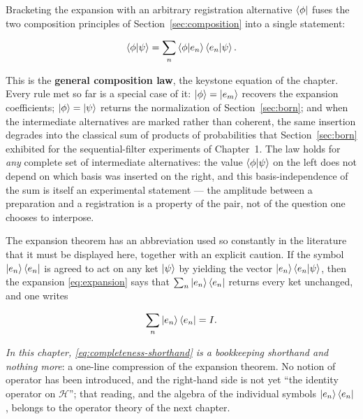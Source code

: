 Bracketing the expansion with an arbitrary registration alternative $\bra{\phi}$ fuses the two composition principles of Section~\ref{sec:composition} into a single statement:
\begin{linenomath}
    \begin{equation}
        \braket{\phi|\psi}=\sum_n\braket{\phi|e_n}\braket{e_n|\psi}.
        \label{eq:composition-law}
    \end{equation}
\end{linenomath}
This is the \textbf{general composition law}, the keystone equation of the chapter. Every rule met so far is a special case of it: $\ket{\phi}=\ket{e_m}$ recovers the expansion coefficients; $\ket{\phi}=\ket{\psi}$ returns the normalization of Section~\ref{sec:born}; and when the intermediate alternatives are marked rather than coherent, the same insertion degrades into the classical sum of products of probabilities that Section~\ref{sec:born} exhibited for the sequential-filter experiments of Chapter~1. The law holds for \emph{any} complete set of intermediate alternatives: the value $\braket{\phi|\psi}$ on the left does not depend on which basis was inserted on the right, and this basis-independence of the sum is itself an experimental statement --- the amplitude between a preparation and a registration is a property of the pair, not of the question one chooses to interpose.

The expansion theorem has an abbreviation used so constantly in the literature that it must be displayed here, together with an explicit caution. If the symbol $\ket{e_n}\bra{e_n}$ is agreed to act on any ket $\ket{\psi}$ by yielding the vector $\ket{e_n}\braket{e_n|\psi}$, then the expansion \eqref{eq:expansion} says that $\sum_n\ket{e_n}\bra{e_n}$ returns every ket unchanged, and one writes
\begin{linenomath}
    \begin{equation}
        \sum_n\ket{e_n}\bra{e_n}=I.
        \label{eq:completeness-shorthand}
    \end{equation}
\end{linenomath}
\emph{In this chapter, \eqref{eq:completeness-shorthand} is a bookkeeping shorthand and nothing more}: a one-line compression of the expansion theorem. No notion of operator has been introduced, and the right-hand side is not yet ``the identity operator on $\mathcal{H}$''; that reading, and the algebra of the individual symbols $\ket{e_n}\bra{e_n}$, belongs to the operator theory of the next chapter.


